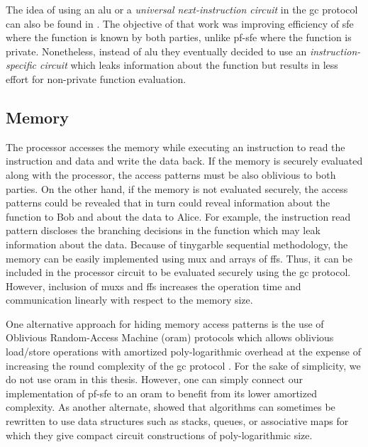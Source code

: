 The idea of using an \acrshort{alu} or a \emph{universal next-instruction circuit} in the \acrshort{gc} protocol can also be found in \cite{liu2014automating}.
The objective of that work was improving efficiency of \acrshort{sfe} where the function is known by both parties, unlike \acrshort{pf-sfe} where the function is private.
Nonetheless, instead of \acrshort{alu} they eventually decided to use an \emph{instruction-specific circuit} which leaks information about the function but results in less effort for non-private function evaluation.

\subsection{Memory}\label{ssec:processor-mem}
The processor accesses the memory while executing an instruction to read the instruction and data and write the data back.
If the memory is securely evaluated along with the processor, the access patterns must be also oblivious to both parties.
On the other hand, if the memory is not evaluated securely, the access patterns could be revealed that in turn could reveal information about the function to Bob and about the data to Alice.
For example, the instruction read pattern discloses the branching decisions in the function which may leak information about the data.
Because of \gls{tinygarble} sequential methodology, the memory can be easily implemented using \acrshort{mux} and arrays of \acrshort{ff}s.
Thus, it can be included in the processor circuit to be evaluated securely using the \acrshort{gc} protocol.
However, inclusion of \acrshort{mux}s and \acrshort{ff}s increases the operation time and communication linearly with respect to the memory size.

One alternative approach for hiding memory access patterns is the use of Oblivious Random-Access Machine (\acrshort{oram}) protocols \cite{goldreich1996software} which allows oblivious load/store operations with amortized poly-logarithmic overhead at the expense of increasing the round complexity of the \acrshort{gc} protocol \cite{gordon2012secure,liu2014automating,lu2013garble,gentry2014garbled}.
For the sake of simplicity, we do not use \acrshort{oram} in this thesis.
However, one can simply connect our implementation of \acrshort{pf-sfe} to an \acrshort{oram} to benefit from its lower amortized complexity.
As another alternate, \cite{zahur2013circuit} showed that algorithms can sometimes be rewritten to use data structures such as stacks, queues, or associative maps for which they give compact circuit constructions of poly-logarithmic size.

